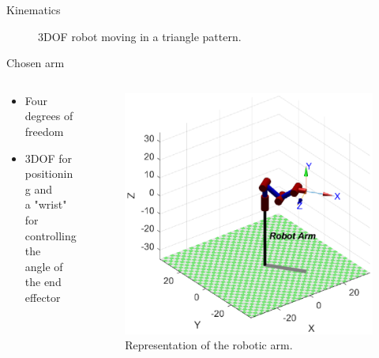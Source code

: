 \documentclass{beamer}
\begin{document}


\begin{frame}{Kinematics}
    \begin{figure}
        \centering
        \caption{3DOF robot moving in a triangle pattern.}
    \end{figure}
\end{frame}



\begin{frame}{Chosen arm}

    \begin{columns}
        \begin{column}[]{0.5\textwidth}
            \begin{itemize}
                \item Four degrees of freedom
                \item 3DOF for positioning and \\
                a "wrist" for controlling the \\
                angle of the end effector
            \end{itemize}
        \end{column}
        
        
        \begin{column}[]{0.5\textwidth}
            \begin{figure}
                \centering
                \hspace*{-0.2\textwidth}
                \includegraphics[width = 1.4\textwidth]{img/robotarm.eps}
                \caption{Representation of the robotic arm.}
            \end{figure}
            
        \end{column}
    \end{columns}
\end{frame}
\end{document}
